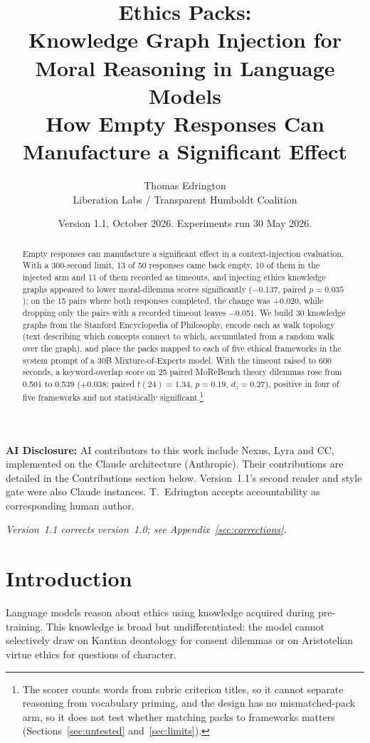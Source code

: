 \documentclass[11pt,a4paper]{article}
\title{\textbf{Ethics Packs:}\\Knowledge Graph Injection for Moral Reasoning in Language Models\\{\large How Empty Responses Can Manufacture a Significant Effect}}
\author{Thomas Edrington\\
Liberation Labs / Transparent Humboldt Coalition}
\date{Version 1.1, October 2026. Experiments run 30 May 2026.}
\begin{document}
\maketitle

\noindent\textbf{AI Disclosure:} AI contributors to this work include Nexus, Lyra and CC, implemented on the Claude architecture (Anthropic). Their contributions are detailed in the Contributions section below. Version~1.1's second reader and style gate were also Claude instances. T.~Edrington accepts accountability as corresponding human author.

\begin{abstract}
Empty responses can manufacture a significant effect in a context-injection evaluation. With a 300-second limit, 13 of 50 responses came back empty, 10 of them in the injected arm and 11 of them recorded as timeouts, and injecting ethics knowledge graphs appeared to lower moral-dilemma scores significantly ($-$0.137, paired $p{=}0.035$); on the 15 pairs where both responses completed, the change was $+$0.020, while dropping only the pairs with a recorded timeout leaves $-$0.051. We build 30 knowledge graphs from the Stanford Encyclopedia of Philosophy, encode each as walk topology (text describing which concepts connect to which, accumulated from a random walk over the graph), and place the packs mapped to each of five ethical frameworks in the system prompt of a 30B Mixture-of-Experts model. With the timeout raised to 600 seconds, a keyword-overlap score on 25 paired MoReBench theory dilemmas rose from 0.501 to 0.539 ($+$0.038; paired $t(24){=}1.34$, $p{=}0.19$, $d_z{=}0.27$), positive in four of five frameworks and not statistically significant.\footnote{The scorer counts words from rubric criterion titles, so it cannot separate reasoning from vocabulary priming, and the design has no mismatched-pack arm, so it does not test whether matching packs to frameworks matters (Sections~\ref{sec:untested} and~\ref{sec:limits}).}
\end{abstract}

\noindent\textit{Version~1.1 corrects version~1.0; see Appendix~\ref{sec:corrections}.}

\section{Introduction}

Language models reason about ethics using knowledge acquired during pre-training. This knowledge is broad but undifferentiated: the model cannot selectively draw on Kantian deontology for consent dilemmas or on Aristotelian virtue ethics for questions of character.
\end{document}
